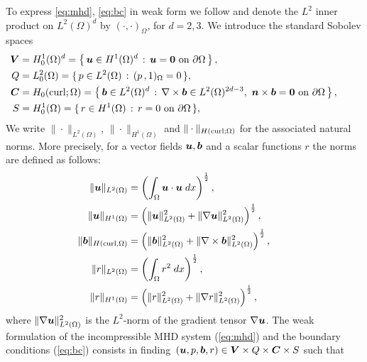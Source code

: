 To express \eqref{eq:mhd}, \eqref{eq:bc} in weak form we follow \cite{schotzau2004mixed} and denote the $L^2$ inner product on $L^2(\Omega)^d$ by $(\cdot,\cdot)_\Omega$, for $d = 2,3$. We introduce the standard Sobolev spaces
\begin{equation} \label{eq:FuncSpace} \nonumber
 \left. \begin{aligned}
\boldsymbol V&=H_0^1(\Omega)^d=\left\{\,\boldsymbol u\in H^1(\Omega)^d\,:\,\text{$\boldsymbol u=\boldsymbol 0$ on $\partial\Omega$}\,\right\},\\
Q&=L^2_0(\Omega)=\{\,p\in L^2(\Omega)\,:\,(p\,,1)_\Omega=0\,\},\\
\boldsymbol C&=H_0({\rm curl};\Omega) = \left\{\,\boldsymbol b\in L^2(\Omega)^d\,:\,\nabla\times\boldsymbol b\in L^2(\Omega)^{2d-3}, \
\text{$\boldsymbol n\times\boldsymbol b=\boldsymbol 0$ on $\partial\Omega$}\,\right\},\\
S&=H^1_0(\Omega)=\{\,r\in H^1(\Omega)\,:\,r=0\ \mbox{on $\partial\Omega$}\,\},
 \end{aligned}
 \right.
 \qquad \text{}
\end{equation}
We write $\|\cdot\|_{L^2(\Omega)}$, $\|\cdot\|_{H^1(\Omega)}$ and $\|\cdot\|_{H(\rm{curl};\Omega)}$ for the associated natural norms. More precisely, for a vector fields $\boldsymbol u,\boldsymbol b$ and a scalar functions $r$ the norms are defined as follows:
\begin{equation} \nonumber
 \left. \begin{aligned}
    \|\boldsymbol u\|_{L^2 (\Omega)} &= \left({\int_{\Omega} \boldsymbol u\cdot\boldsymbol u\;dx}\right)^{\frac{1}{2}},\\
   \|\boldsymbol u\|_{H^1(\Omega)} &=  \left(\|\boldsymbol u\|_{L^2(\Omega)}^2 + \|\nabla  \boldsymbol u\|_{L^2(\Omega)}^2 \right)^{\frac{1}{2}},\\
   \|\boldsymbol b\|_{H(\rm{curl},\Omega)} &=  \left(\|\boldsymbol b\|_{L^2(\Omega)}^2 + \|\nabla \times \boldsymbol b\|_{L^2(\Omega)}^2 \right)^{\frac{1}{2}}, \\
    \|r\|_{L^2 (\Omega)} &= \left({\int_{\Omega} r^2\;dx}\right)^{\frac{1}{2}},\\
    \|r\|_{H^1(\Omega)} &=  \left(\|r\|_{L^2(\Omega)}^2 + \|\nabla  r\|_{L^2(\Omega)}^2 \right)^{\frac{1}{2}},\\
 \end{aligned}
 \right.
 \qquad \text{}
\end{equation}
where $\|\nabla  \boldsymbol u\|_{L^2(\Omega)}^2$ is the $L^2$-norm of the gradient tensor $\nabla \boldsymbol u$. The weak formulation of the incompressible MHD system (\ref{eq:mhd}) and the boundary conditions (\ref{eq:bc}) consists in finding~$(\boldsymbol u,p,\boldsymbol b,r)\in \boldsymbol V \times Q\times \boldsymbol C \times S$ such that
